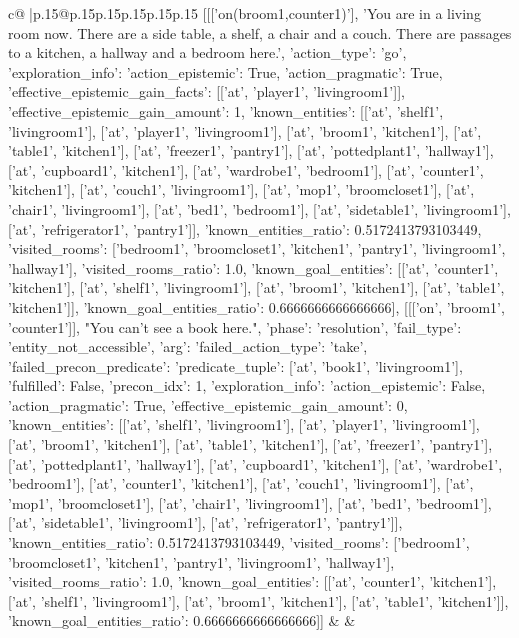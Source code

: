 \documentclass{article}
\begin{document}
{\begin{supertabular}{c@{$\;$}|p{.15\linewidth}@{}p{.15\linewidth}p{.15\linewidth}p{.15\linewidth}p{.15\linewidth}p{.15\linewidth}}
{{{	 [[['on(broom1,counter1)'], 'You are in a living room now. There are a side table, a shelf, a chair and a couch. There are passages to a kitchen, a hallway and a bedroom here.', {'action_type': 'go', 'exploration_info': {'action_epistemic': True, 'action_pragmatic': True, 'effective_epistemic_gain_facts': [['at', 'player1', 'livingroom1']], 'effective_epistemic_gain_amount': 1, 'known_entities': [['at', 'shelf1', 'livingroom1'], ['at', 'player1', 'livingroom1'], ['at', 'broom1', 'kitchen1'], ['at', 'table1', 'kitchen1'], ['at', 'freezer1', 'pantry1'], ['at', 'pottedplant1', 'hallway1'], ['at', 'cupboard1', 'kitchen1'], ['at', 'wardrobe1', 'bedroom1'], ['at', 'counter1', 'kitchen1'], ['at', 'couch1', 'livingroom1'], ['at', 'mop1', 'broomcloset1'], ['at', 'chair1', 'livingroom1'], ['at', 'bed1', 'bedroom1'], ['at', 'sidetable1', 'livingroom1'], ['at', 'refrigerator1', 'pantry1']], 'known_entities_ratio': 0.5172413793103449, 'visited_rooms': ['bedroom1', 'broomcloset1', 'kitchen1', 'pantry1', 'livingroom1', 'hallway1'], 'visited_rooms_ratio': 1.0, 'known_goal_entities': [['at', 'counter1', 'kitchen1'], ['at', 'shelf1', 'livingroom1'], ['at', 'broom1', 'kitchen1'], ['at', 'table1', 'kitchen1']], 'known_goal_entities_ratio': 0.6666666666666666}}], [[['on', 'broom1', 'counter1']], "You can't see a book here.", {'phase': 'resolution', 'fail_type': 'entity_not_accessible', 'arg': {'failed_action_type': 'take', 'failed_precon_predicate': {'predicate_tuple': ['at', 'book1', 'livingroom1'], 'fulfilled': False, 'precon_idx': 1}}, 'exploration_info': {'action_epistemic': False, 'action_pragmatic': True, 'effective_epistemic_gain_amount': 0, 'known_entities': [['at', 'shelf1', 'livingroom1'], ['at', 'player1', 'livingroom1'], ['at', 'broom1', 'kitchen1'], ['at', 'table1', 'kitchen1'], ['at', 'freezer1', 'pantry1'], ['at', 'pottedplant1', 'hallway1'], ['at', 'cupboard1', 'kitchen1'], ['at', 'wardrobe1', 'bedroom1'], ['at', 'counter1', 'kitchen1'], ['at', 'couch1', 'livingroom1'], ['at', 'mop1', 'broomcloset1'], ['at', 'chair1', 'livingroom1'], ['at', 'bed1', 'bedroom1'], ['at', 'sidetable1', 'livingroom1'], ['at', 'refrigerator1', 'pantry1']], 'known_entities_ratio': 0.5172413793103449, 'visited_rooms': ['bedroom1', 'broomcloset1', 'kitchen1', 'pantry1', 'livingroom1', 'hallway1'], 'visited_rooms_ratio': 1.0, 'known_goal_entities': [['at', 'counter1', 'kitchen1'], ['at', 'shelf1', 'livingroom1'], ['at', 'broom1', 'kitchen1'], ['at', 'table1', 'kitchen1']], 'known_goal_entities_ratio': 0.6666666666666666}}]] 
	  } 
	   } 
	   } 
	 & & \\ 
 


\end{supertabular}}
\end{document}
